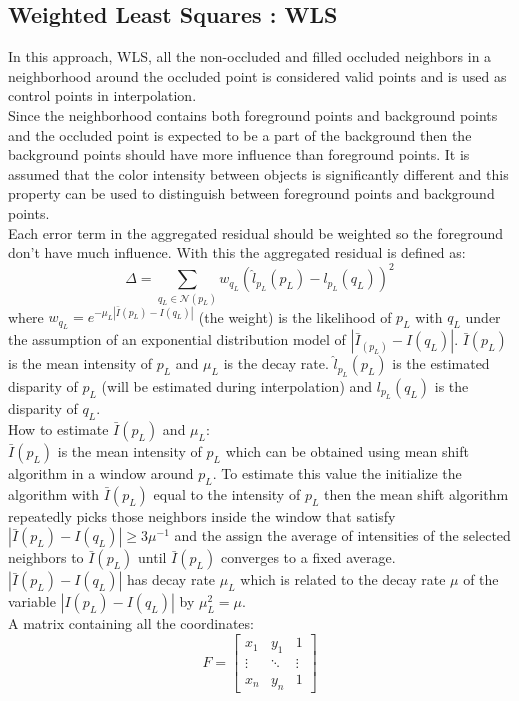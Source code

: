 \subsection{Weighted Least Squares : WLS}
In this approach, WLS, all the non-occluded and filled occluded neighbors in a neighborhood around the occluded point is considered valid points and is used as control points in interpolation.\\
Since the neighborhood contains both foreground points and background points and the occluded point is expected to be a part of the background then the background points should have more influence than foreground points. It is assumed that the color intensity between objects is significantly different and this property can be used to distinguish between foreground points and background points. \\
Each error term in the aggregated residual should be weighted so the foreground don't have much influence. With this the aggregated residual is defined as:
\begin{equation}
  \Delta = \sum_{q_L \in \mathcal{N}(p_L)} w_{q_L} (\hat{l}_{p_L}(p_L)-l_{p_L}(q_L))^2
\end{equation}
where $w_{q_L} = e^{-\mu_L | \bar{I}(p_L) - I(q_L)|}$ (the weight) is the likelihood of $p_L$ with $q_L$ under the assumption of an exponential distribution model of $| \bar{I}_(p_L)- I(q_L) |$. $\bar{I}(p_L)$ is the mean intensity of $p_L$ and $\mu_L$ is the decay rate. $\hat{l}_{p_L}(p_L)$ is the estimated disparity of $p_L$ (will be estimated during interpolation) and $l_{p_L}(q_L)$ is the disparity of $q_L$. \\
How to estimate $\bar{I}(p_L)$ and $\mu_L$:\\
$\bar{I}(p_L)$ is the mean intensity of $p_L$ which can be obtained using mean shift algorithm in a window around $p_L$. To estimate this value the initialize the algorithm with $\bar{I}(p_L) $ equal to the intensity of $p_L$ then the mean shift algorithm repeatedly picks those neighbors inside the window that satisfy $| \bar{I}(p_L) - I (q_L) | \geq 3\mu^{-1}$ and the assign the average of intensities of the selected neighbors to $\bar{I}(p_L)$ until $\bar{I}(p_L)$ converges to a fixed average. $|\bar{I}(p_L) - I(q_L)|$ has decay rate $\mu_L$ which is related to the decay rate $\mu$ of the variable $|I(p_L) - I(q_L)|$ by $\mu_L^2 = \mu$.\\
A matrix containing all the coordinates:
\begin{equation}
F = \begin{bmatrix}
  x_1 & y_1 & 1 \\
  \vdots & \ddots & \vdots\\
  x_n & y_n & 1
\end{bmatrix}
\end{equation}
